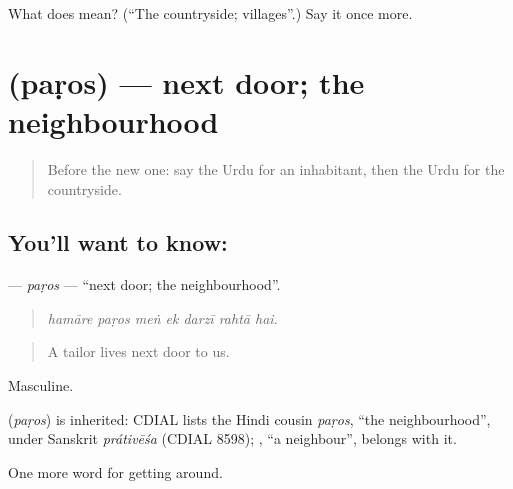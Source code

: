 \begin{tcolorbox}[breakable,colback=teal!4,colframe=teal!35!black,title={Before you move on}]
What does  mean? (\textquotedblleft{}The countryside; villages\textquotedblright{}.) Say it once more.
\end{tcolorbox}
\section[\texorpdfstring{\ur{پڑوس} (paṛos)}{پڑوس (paṛos)}]{ (paṛos) — next door; the neighbourhood}

\label{lesson:UR-C412-paros}



\begin{quote}
Before the new one: say the Urdu for an inhabitant, then the Urdu for the countryside.
\end{quote}

\subsection*{You'll want to know: }
\textbf{} — \emph{paṛos} — \textquotedblleft{}next door; the neighbourhood\textquotedblright{}.

\begin{quote}
      
\end{quote}

\begin{quote}
\emph{hamāre paṛos meṅ ek darzī rahtā hai.}
\end{quote}

\begin{quote}
A tailor lives next door to us.
\end{quote}

Masculine.

\begin{cousinweb}
\textbf{} (\emph{paṛos}) is inherited: CDIAL lists the Hindi cousin \emph{paṛos}, \textquotedblleft{}the neighbourhood\textquotedblright{}, under Sanskrit \emph{prátivēśa} (CDIAL 8598); \textbf{}, \textquotedblleft{}a neighbour\textquotedblright{}, belongs with it.
\end{cousinweb}

\begin{grammarlens}[title={What you've built}]
One more word for getting around.
\end{grammarlens}

